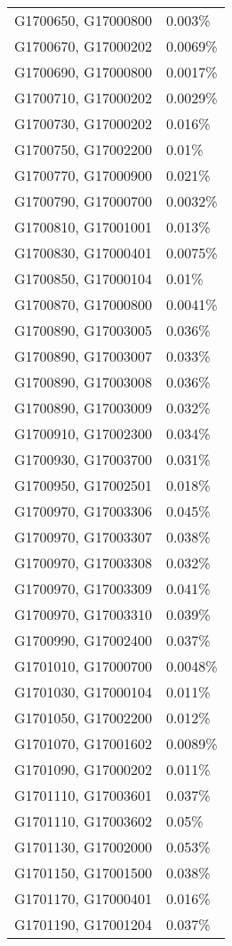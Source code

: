 \begin{longtable}[]{@{}ll@{}}
G1700650, G17000800 & 0.003\% \\
G1700670, G17000202 & 0.0069\% \\
G1700690, G17000800 & 0.0017\% \\
G1700710, G17000202 & 0.0029\% \\
G1700730, G17000202 & 0.016\% \\
G1700750, G17002200 & 0.01\% \\
G1700770, G17000900 & 0.021\% \\
G1700790, G17000700 & 0.0032\% \\
G1700810, G17001001 & 0.013\% \\
G1700830, G17000401 & 0.0075\% \\
G1700850, G17000104 & 0.01\% \\
G1700870, G17000800 & 0.0041\% \\
G1700890, G17003005 & 0.036\% \\
G1700890, G17003007 & 0.033\% \\
G1700890, G17003008 & 0.036\% \\
G1700890, G17003009 & 0.032\% \\
G1700910, G17002300 & 0.034\% \\
G1700930, G17003700 & 0.031\% \\
G1700950, G17002501 & 0.018\% \\
G1700970, G17003306 & 0.045\% \\
G1700970, G17003307 & 0.038\% \\
G1700970, G17003308 & 0.032\% \\
G1700970, G17003309 & 0.041\% \\
G1700970, G17003310 & 0.039\% \\
G1700990, G17002400 & 0.037\% \\
G1701010, G17000700 & 0.0048\% \\
G1701030, G17000104 & 0.011\% \\
G1701050, G17002200 & 0.012\% \\
G1701070, G17001602 & 0.0089\% \\
G1701090, G17000202 & 0.011\% \\
G1701110, G17003601 & 0.037\% \\
G1701110, G17003602 & 0.05\% \\
G1701130, G17002000 & 0.053\% \\
G1701150, G17001500 & 0.038\% \\
G1701170, G17000401 & 0.016\% \\
G1701190, G17001204 & 0.037\% \\

\end{longtable}
